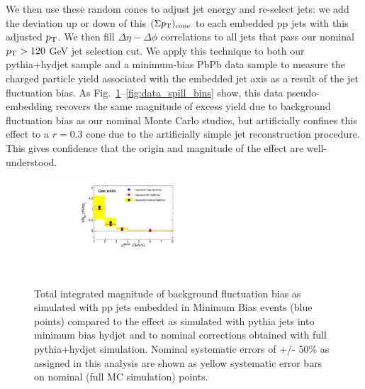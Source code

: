 We then use these random cones to adjust jet energy and re-select jets:  we add the deviation up or down of this $(\Sigma p_{\rm T})_{\rm cone}$ to each embedded pp jets with this adjusted $p_{\rm T}$.  We then fill $\Delta\eta - \Delta\phi$ correlations to all jets that pass our nominal $p_{\rm T} > 120$ GeV jet selection cut.  We apply this technique to both our {\sc pythia+hydjet} sample and a minimum-bias PbPb data sample to measure the charged particle yield associated with the embedded jet axis as a result of the jet fluctuation bias.  As Fig.~\ref{fig:data_spill_int}--\ref{fig:data_spill_bins} show, this data pseudo-embedding recovers the same magnitude of excess yield due to background fluctuation bias as our nominal Monte Carlo studies, but artificially confines this effect to a $r = 0.3$ cone due to the artificially simple jet reconstruction procedure.  This gives confidence that the origin and magnitude of the effect are well-understood.

\begin{figure}[h!]
\begin{center}
\includegraphics[width=0.49\textwidth]{figures/JFF_SpillOver/Data_Closure_Integrals.pdf}

\caption[Data-driven check of integrated yields attributed to background fluctuation bias]{Total integrated magnitude of background fluctuation bias as simulated with pp jets embedded in Minimum Bias events (blue points) compared to the effect as simulated with {\sc pythia}  jets into minimum bias {\sc hydjet} and to nominal corrections obtained with full {\sc pythia+hydjet} simulation. Nominal systematic errors of +/- 50\% as assigned in this analysis are shown as yellow systematic error bars on nominal (full MC simulation) points.}
\label{fig:data_spill_int}
\end{center}
\end{figure}


